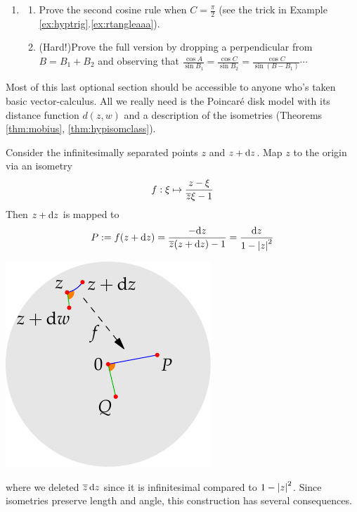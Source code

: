 \begin{exercises}
\begin{enumerate}
				
 		\item\label{exs:hcosruleII}
 		\begin{enumerate}
		  \item Prove the second cosine rule when $C=\frac\pi 2$ (see the trick in Example \ref*{ex:hyptrig}.\ref{ex:rtangleaaa}).
		  \item (Hard!)\lstsp Prove the full version by dropping a perpendicular from $B=B_1+B_2$ and observing that $\frac{\cos A}{\sin B_1}=\frac{\cos C}{\sin B_2}=\frac{\cos C}{\sin(B-B_1)}\cdots$
		\end{enumerate}
	\end{enumerate}
\end{exercises}

\vspace{-5pt}



\goodbreak


\label{pg:hyp1stform}

Most of this last optional section should be accessible to anyone who's taken basic vector-calculus. All we really need is the Poincaré disk model with its distance function $d(z,w)$ and a description of the isometries (Theorems \ref{thm:mobius}, \ref{thm:hypisomclass}).\smallbreak

\begin{minipage}[t]{0.69\linewidth}\vspace{0pt}
	Consider the infinitesimally separated points $z$ and $z+{\mathrm{d} z}$. Map $z$ to the origin via an isometry
	\[
		f:\xi\mapsto \frac{z-\xi}{\overline{z}\xi-1}
	\]
	Then $z+{\mathrm{d} z}$ is mapped to
	\[
		P:=f(z+{\mathrm{d} z})=\frac{-{\mathrm{d} z}}{\overline{z}(z+{\mathrm{d} z})-1} =\frac{{\mathrm{d} z}}{1-\left| z\right|^2}
	\]
\end{minipage}
\hfill
\begin{minipage}[t]{0.3\linewidth}\vspace{0pt}
	\flushright\includegraphics[scale=0.9]{isom-arclength}
\end{minipage}
\medbreak
where we deleted $\overline{z}\,{\mathrm{d} z}$ since it is infinitesimal compared to $1-\left| z\right|^2$.\smallbreak
Since isometries preserve length and angle, this construction has several consequences.

